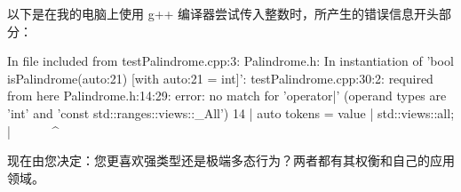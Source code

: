 以下是在我的电脑上使用 g++ 编译器尝试传入整数时，所产生的错误信息开头部分：

\begin{shell}
In file included from testPalindrome.cpp:3:
Palindrome.h: In instantiation of 'bool isPalindrome(auto:21)
[with auto:21 = int]':
testPalindrome.cpp:30:2: required from here
Palindrome.h:14:29: error: no match for 'operator|' (operand types are 'int' and 'const std::ranges::views::_All')
14 | auto tokens = value | std::views::all;
   | ~~~~~~^~~~~~~~~~~~~~~~~
\end{shell}

现在由您决定：您更喜欢强类型还是极端多态行为？两者都有其权衡和自己的应用领域。




















